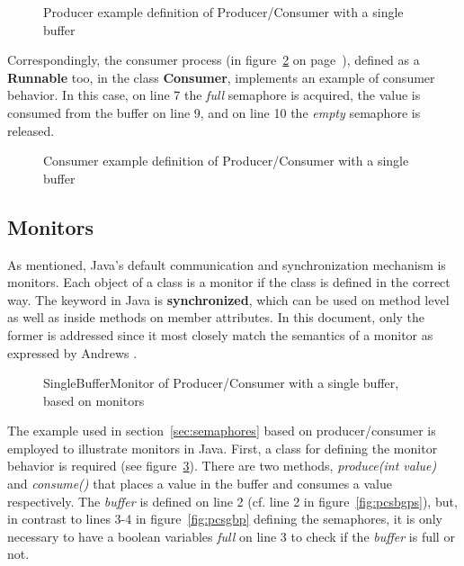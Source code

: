 \documentclass[11pt]{article} %
\begin{document}
\begin{figure}[h]

\caption{Producer example definition of Producer/Consumer with a single buffer}
\label{fig:pcsbproc}
\end{figure}

Correspondingly, the consumer process (in figure~\ref{fig:pcsbcons} on page~\pageref{fig:pcsbcons}), defined as a {\bfseries Runnable} too, in the class {\bfseries Consumer}, implements an example of consumer behavior. In this case, on line 7 the \emph{full} semaphore is acquired, the value is consumed from the buffer on line 9, and on line 10 the \emph{empty} semaphore is released. 

\begin{figure}[h]

\caption{Consumer example definition of Producer/Consumer with a single buffer}
\label{fig:pcsbcons}
\end{figure}

\subsection{Monitors}

As mentioned, Java's default communication and synchronization mechanism is monitors. Each object of a class is a monitor if the class is defined in the correct way. The keyword in Java is {\bfseries synchronized}, which can be used on method level as well as inside methods on member attributes. In this document, only the former is addressed since it most closely match the semantics of a monitor as expressed by Andrews \cite[ch. 5]{andrews_foundations_2000}. 

\lstset{inputpath=c:/git/IT325G/IT325G/examples/se/his/iit/it325g/examples/monitors/multipleProducerConsumerSingleBuffer}
\begin{figure}[ht]

\caption{SingleBufferMonitor of Producer/Consumer with a single buffer, based on monitors}
\label{fig:pcsbsbm-monitor}
\end{figure}

The example used in section~\ref{sec:semaphores} based on producer/consumer is employed to illustrate monitors in Java. First, a class for defining the monitor behavior is required (see figure~\ref{fig:pcsbsbm-monitor}). There are two methods, \emph{produce(int value)} and \emph{consume()} that places a value in the buffer and consumes a value respectively. The \emph{buffer} is defined on line 2 (cf. line 2 in figure~\ref{fig:pcsbgps}), but, in contrast to lines 3-4 in figure~\ref{fig:pcsgbp} defining the semaphores, it is only necessary to have a boolean variables \emph{full} on line 3 to check if the \emph{buffer} is full or not. 
\end{document}

